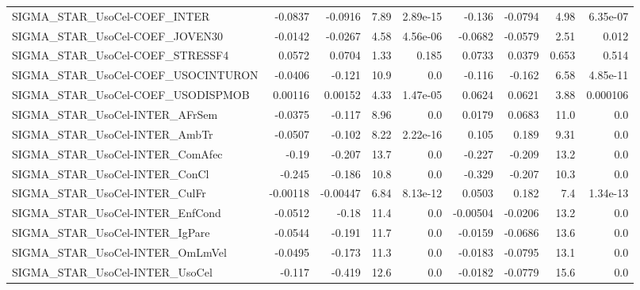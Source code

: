 \begin{tabular}{lrrrrrrrr}
SIGMA\_STAR\_UsoCel-COEF\_INTER          &     -0.0837 &      -0.0916 &     7.89 & 2.89e-15 &     -0.136 &     -0.0794 &         4.98 &      6.35e-07 \\
SIGMA\_STAR\_UsoCel-COEF\_JOVEN30        &     -0.0142 &      -0.0267 &     4.58 & 4.56e-06 &    -0.0682 &     -0.0579 &         2.51 &         0.012 \\
SIGMA\_STAR\_UsoCel-COEF\_STRESSF4       &      0.0572 &       0.0704 &     1.33 &    0.185 &     0.0733 &      0.0379 &        0.653 &         0.514 \\
SIGMA\_STAR\_UsoCel-COEF\_USOCINTURON    &     -0.0406 &       -0.121 &     10.9 &      0.0 &     -0.116 &      -0.162 &         6.58 &      4.85e-11 \\
SIGMA\_STAR\_UsoCel-COEF\_USODISPMOB     &     0.00116 &      0.00152 &     4.33 & 1.47e-05 &     0.0624 &      0.0621 &         3.88 &      0.000106 \\
SIGMA\_STAR\_UsoCel-INTER\_AFrSem        &     -0.0375 &       -0.117 &     8.96 &      0.0 &     0.0179 &      0.0683 &         11.0 &           0.0 \\
SIGMA\_STAR\_UsoCel-INTER\_AmbTr         &     -0.0507 &       -0.102 &     8.22 & 2.22e-16 &      0.105 &       0.189 &         9.31 &           0.0 \\
SIGMA\_STAR\_UsoCel-INTER\_ComAfec       &       -0.19 &       -0.207 &     13.7 &      0.0 &     -0.227 &      -0.209 &         13.2 &           0.0 \\
SIGMA\_STAR\_UsoCel-INTER\_ConCl         &      -0.245 &       -0.186 &     10.8 &      0.0 &     -0.329 &      -0.207 &         10.3 &           0.0 \\
SIGMA\_STAR\_UsoCel-INTER\_CulFr         &    -0.00118 &     -0.00447 &     6.84 & 8.13e-12 &     0.0503 &       0.182 &          7.4 &      1.34e-13 \\
SIGMA\_STAR\_UsoCel-INTER\_EnfCond       &     -0.0512 &        -0.18 &     11.4 &      0.0 &   -0.00504 &     -0.0206 &         13.2 &           0.0 \\
SIGMA\_STAR\_UsoCel-INTER\_IgPare        &     -0.0544 &       -0.191 &     11.7 &      0.0 &    -0.0159 &     -0.0686 &         13.6 &           0.0 \\
SIGMA\_STAR\_UsoCel-INTER\_OmLmVel       &     -0.0495 &       -0.173 &     11.3 &      0.0 &    -0.0183 &     -0.0795 &         13.1 &           0.0 \\
SIGMA\_STAR\_UsoCel-INTER\_UsoCel        &      -0.117 &       -0.419 &     12.6 &      0.0 &    -0.0182 &     -0.0779 &         15.6 &           0.0 \\

\end{tabular}
